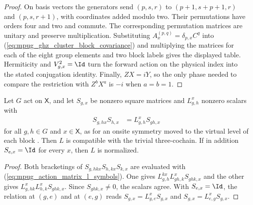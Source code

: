 \begin{proof}\leanok
    On basis vectors the generators send $(p,s,r)$ to $(p+1,s+p+1,r)$
    and $(p,s,r+1)$, with coordinates added modulo two. Their permutations
    have orders four and two and commute. The corresponding permutation
    matrices are unitary and preserve multiplication.
    Substituting $A_x^{(p,q)}=\delta_{p,x}C^q$ into
    (\ref{eq:mpug_ghz_cluster_block_covariance}) and multiplying the matrices
    for each of the eight group elements and two block labels gives the
    displayed table. Hermiticity and $V_{g,x}^2=\Id$ turn the forward action
    on the physical index into the stated conjugation identity.
    Finally, $ZX=iY$, so the only phase needed to compare the restriction
    with $Z^bX^a$ is $-i$ when $a=b=1$.
\end{proof}

\begin{lemma}
    \label{thm:mpug_l_symbols_action_matrices}
    \leanok
    Let $G$ act on $\mathsf X$, and let $S_{g,x}$ be nonzero square matrices
    and $L^x_{g,h}$ nonzero scalars with
    \begin{align}
        S_{g,hx}S_{h,x} & =L^x_{g,h}S_{gh,x}
        \label{eq:mpug_action_matrix_l_symbols}
    \end{align}
    for all $g,h\in G$ and $x\in\mathsf X$, as for an onsite symmetry moved to
    the virtual level of each block
    \cite[lines~4363--4368]{FrancoRubio2025MPUGauging}. Then $L$ is compatible
    with the trivial three-cochain. If in addition $S_{e,x}=\Id$ for every $x$,
    then $L$ is normalized.
\end{lemma}

\begin{proof}\leanok
    Both bracketings of $S_{g,hkx}S_{h,kx}S_{k,x}$ are evaluated with
    (\ref{eq:mpug_action_matrix_l_symbols}). One gives
    $L^{kx}_{g,h}L^x_{gh,k}S_{ghk,x}$ and the other gives
    $L^x_{g,hk}L^x_{h,k}S_{ghk,x}$. Since $S_{ghk,x}\neq0$, the scalars agree.
    With $S_{e,x}=\Id$, the relation at $(g,e)$ and at $(e,g)$ reads
    $S_{g,x}=L^x_{g,e}S_{g,x}$ and $S_{g,x}=L^x_{e,g}S_{g,x}$.
\end{proof}


